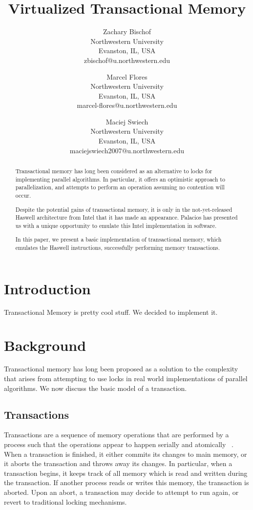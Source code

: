 \documentclass{acm_proc_article-sp}
\title{Virtualized Transactional Memory}
\author{Zachary Bischof \\
	Northwestern University\\
	Evanston, IL, USA\\
	zbischof@u.northwestern.edu
	\and 
	Marcel Flores \\
	Northwestern University\\
	Evanston, IL, USA\\
	marcel-flores@u.northwestern.edu
	\and
	Maciej Swiech \\
	Northwestern University\\
	Evanston, IL, USA\\
	maciejswiech2007@u.northwestern.edu
	}
\begin{document}
\maketitle

\begin{abstract}
Transactional memory has long been considered as an alternative to locks for
implementing parallel algorithms. In particular, it offers an optimistic
approach to parallelization, and attempts to perform an operation assuming no
contention will occur.

Despite the potential gains of transactional memory, it is only in the 
not-yet-released Haswell architecture from Intel that it has made an appearance.
Palacios has presented us with a unique opportunity to emulate this Intel
implementation in software.

In this paper, we present a basic implementation of transactional memory, which
emulates the Haswell instructions, successfully performing memory transactions.
\end{abstract}

\section{Introduction}
Transactional Memory is pretty cool stuff. We decided to implement it.

\section{Background}
Transactional memory has long been proposed as a solution to the complexity 
that arises from attempting to use locks in real world implementations of 
parallel algorithms. We now discuss the basic model of a transaction.

\subsection{Transactions}
Transactions are a sequence of memory operations that are performed by a 
process such that the operations appear to happen serially and atomically
~\cite{Herlihy:1993:TMA:173682.165164}. When a transaction is finished, it 
either commits its changes to main memory, or it aborts the transaction
and throws away its changes. In particular, when a transaction begins, it
keeps track of all memory which is read and written during the transaction.
If another process reads or writes this memory, the transaction is aborted.
Upon an abort, a transaction may decide to attempt to run again, or revert
to traditional locking mechanisms.
\end{document}
